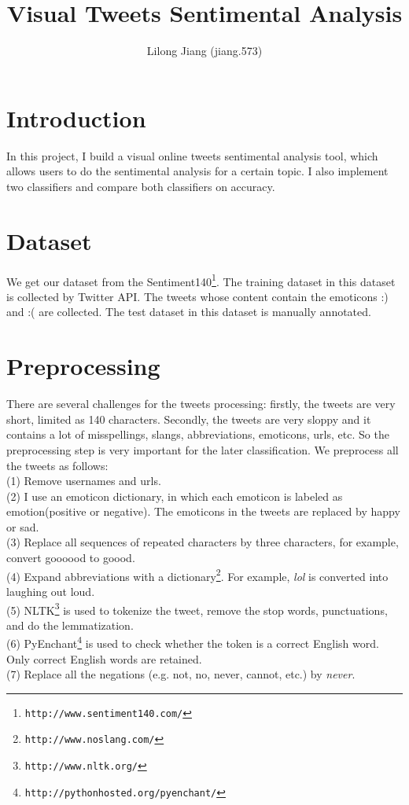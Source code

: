 \documentclass{article}
\begin{document}
\title{Visual Tweets Sentimental Analysis}
\author{Lilong Jiang (jiang.573)}
\maketitle

\section{Introduction}
In this project, I build a visual online tweets sentimental analysis tool, which allows users to do the sentimental analysis for a certain topic. I also implement two classifiers and compare both classifiers on accuracy. 
\section{Dataset}
We get our dataset from the Sentiment140\footnote{\texttt{\scriptsize{http://www.sentiment140.com/‎}}}. The training dataset in this dataset is collected by Twitter API. The tweets whose content contain the emoticons :) and :( are collected. The test dataset in this dataset is manually annotated.
\section{Preprocessing}
There are several challenges for the tweets processing: firstly, the tweets are very short, limited as 140 characters. Secondly, the tweets are very sloppy and it contains a lot of misspellings, slangs, abbreviations, emoticons, urls, etc. So the preprocessing step is very important for the later classification.
We preprocess all the tweets as follows: \\
(1) Remove usernames and urls. \\
(2) I use an emoticon dictionary, in which each emoticon is labeled as emotion(positive or negative). The emoticons in the tweets are replaced by happy or sad. \\
(3) Replace all sequences of repeated characters by three characters, for example, convert goooood to goood.\\
(4) Expand abbreviations with a dictionary\footnote{\texttt{\scriptsize{http://www.noslang.com/‎‎}}}. For example, \emph{lol} is converted into laughing out loud. \\
(5) NLTK\footnote{\texttt{\scriptsize{http://www.nltk.org/‎‎}}} is used to tokenize the tweet, remove the stop words, punctuations, and do the lemmatization. \\
(6) PyEnchant\footnote{\texttt{\scriptsize{http://pythonhosted.org/pyenchant/‎‎}}} is used to check whether the token is a correct English word. Only correct English words are retained.\\ 
(7) Replace all the negations (e.g. not, no, never, cannot, etc.) by \emph{never}.
\end{document}
